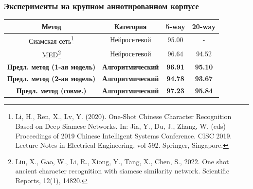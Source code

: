 \begin{frame}
    \frametitle{Эксперименты на крупном аннотированном корпусе}
    \begin{table}
        \centering
        \captionsetup{justification=centering} %
        \begin{tabular}{cccc}
            \toprule
            \textbf{Метод}                                                                                                                                                                                                                                                                                                       & \textbf{Категория}       & \textbf{5-way} & \textbf{20-way} \\
            \midrule
            Сиамская сеть\footnote[1]{Li, H., Ren, X., Lv, Y. (2020). One-Shot Chinese Character Recognition Based on Deep Siamese Networks. In: Jia, Y., Du, J., Zhang, W. (eds) Proceedings of 2019 Chinese Intelligent Systems Conference. CISC 2019. Lecture Notes in Electrical Engineering, vol 592. Springer, Singapore.} & Нейросетевой             & 95.00          & -               \\
            MED\footnote[2]{Liu, X., Gao, W., Li, R., Xiong, Y., Tang, X., Chen, S., 2022. One shot ancient character recognition with siamese similarity network. Scientific Reports, 12(1), 14820.}                                                                                                                            & Нейросетевой             & 96.64          & 94.52           \\
            \textbf{Предл. метод (1-ая модель)}                                                                                                                                                                                                                                                                                  & \textbf{Алгоритмический} & \textbf{96.91} & \textbf{95.10}  \\
            \textbf{Предл. метод (2-ая модель)}                                                                                                                                                                                                                                                                                  & \textbf{Алгоритмический} & \textbf{94.78} & \textbf{93.67}  \\
            \textbf{Предл. метод (совме.)}                                                                                                                                                                                                                                                                                       & \textbf{Алгоритмический} & \textbf{97.23} & \textbf{95.84}  \\
            \bottomrule
        \end{tabular}
    \end{table}


\end{frame}
